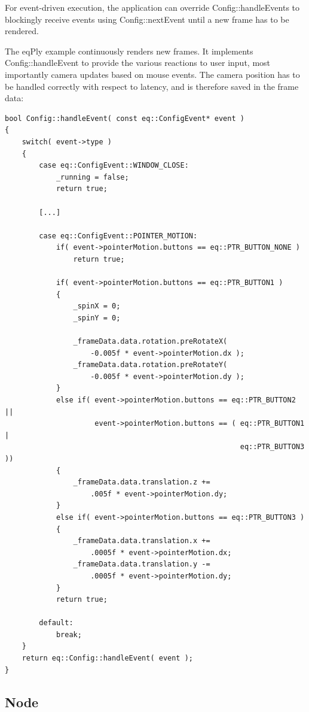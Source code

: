 \documentclass[10pt,a4]{scrartcl}
\begin{document}
For event-driven execution, the application can override
\textsf{Config::handleEvents} to blockingly receive events using
\textsf{Config::nextEvent} until a new frame has to be rendered.

The \textsf{eqPly} example continuously renders new frames. It
implements \textsf{Config::hand\-le\-Event} to provide the various reactions
to user input, most importantly camera updates based on mouse
events. The camera position has to be handled correctly with respect to
latency, and is therefore saved in the frame data:

{\footnotesize\begin{lstlisting}
bool Config::handleEvent( const eq::ConfigEvent* event )
{
    switch( event->type )
    {
        case eq::ConfigEvent::WINDOW_CLOSE:
            _running = false;
            return true;

        [...]

        case eq::ConfigEvent::POINTER_MOTION:
            if( event->pointerMotion.buttons == eq::PTR_BUTTON_NONE )
                return true;

            if( event->pointerMotion.buttons == eq::PTR_BUTTON1 )
            {
                _spinX = 0;
                _spinY = 0;

                _frameData.data.rotation.preRotateX( 
                    -0.005f * event->pointerMotion.dx );
                _frameData.data.rotation.preRotateY(
                    -0.005f * event->pointerMotion.dy );
            }
            else if( event->pointerMotion.buttons == eq::PTR_BUTTON2 ||
                     event->pointerMotion.buttons == ( eq::PTR_BUTTON1 |
                                                       eq::PTR_BUTTON3 ))
            {
                _frameData.data.translation.z +=
                    .005f * event->pointerMotion.dy;
            }
            else if( event->pointerMotion.buttons == eq::PTR_BUTTON3 )
            {
                _frameData.data.translation.x += 
                    .0005f * event->pointerMotion.dx;
                _frameData.data.translation.y -= 
                    .0005f * event->pointerMotion.dy;
            }
            return true;

        default:
            break;
    }
    return eq::Config::handleEvent( event );
}
\end{lstlisting}}


\subsection{Node}
\end{document}
